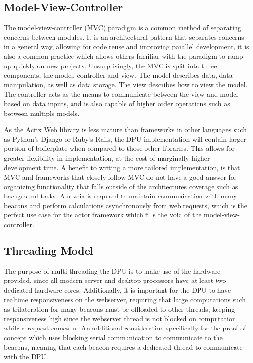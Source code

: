 \bigskip
\subsection{Model-View-Controller}
\medskip
The model-view-controller (MVC) paradigm is a common method of separating concerns between modules.
It is an architectural pattern that separates concerns in a general way, allowing for code reuse and improving parallel development, it is also a common practice which allows others familiar with the paradigm to ramp up quickly on new projects.
Unsurprisingly, the MVC is split into three components, the model, controller and view.
The model describes data, data manipulation, as well as data storage.
The view describes how to view the model.
The controller acts as the means to communicate between the view and model based on data inputs, and is also capable of higher order operations such as between multiple models.

\bigskip
As the Actix Web library is less mature than frameworks in other languages such as Python's Django or Ruby's Rails, the DPU implementation will contain larger portion of boilerplate when compared to those other libraries.
This allows for greater flexibility in implementation, at the cost of marginally higher development time.
A benefit to writing a more tailored implementation, is that MVC and frameworks that closely follow MVC do not have a good answer for organizing functionality that falls outside of the architectures coverage such as background tasks.
Akriveia is required to maintain communication with many beacons and perform calculations asynchronously from web requests, which is the perfect use case for the actor framework which fills the void of the model-view-controller.

\bigskip
\pagebreak
\subsection{Threading Model}
\medskip
The purpose of multi-threading the DPU is to make use of the hardware provided, since all modern server and desktop processors have at least two dedicated hardware cores.
Additionally, it is important for the DPU to have realtime responsiveness on the webserver, requiring that large computations such as trilateration for many beacons must be offloaded to other threads, keeping responsiveness high since the webserver thread is not blocked on computation while a request comes in.
An additional consideration specifically for the proof of concept which uses blocking serial communication to communicate to the beacons, meaning that each beacon requires a dedicated thread to communicate with the DPU.

